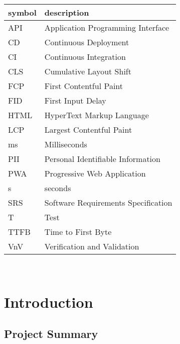 \documentclass[12pt, titlepage]{article}
\begin{document}
\renewcommand{\arraystretch}{1.2}
\begin{tabular}{l l}
	\toprule
	\textbf{symbol} & \textbf{description}                \\
	\midrule
	API             & Application Programming Interface   \\
	CD              & Continuous Deployment               \\
	CI              & Continuous Integration              \\
	CLS             & Cumulative Layout Shift             \\
	FCP             & First Contentful Paint              \\
	FID             & First Input Delay                   \\
	HTML            & HyperText Markup Language           \\
	LCP             & Largest Contentful Paint            \\
	ms              & Milliseconds                        \\
	PII             & Personal Identifiable Information   \\
	PWA             & Progressive Web Application         \\
	s               & seconds                             \\
	SRS             & Software Requirements Specification \\
	T               & Test                                \\
	TTFB            & Time to First Byte                  \\
	VnV             & Verification and Validation         \\
	\bottomrule
\end{tabular}\\

\newpage

\tableofcontents

\listoftables %

\listoffigures %

\newpage


\section{Introduction}

\subsection{Project Summary}
\end{document}
